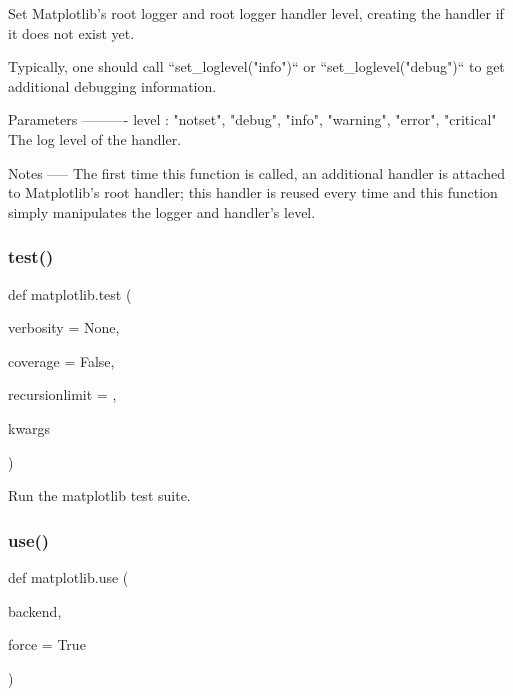 \begin{DoxyVerb}Set Matplotlib's root logger and root logger handler level, creating
the handler if it does not exist yet.

Typically, one should call ``set_loglevel("info")`` or
``set_loglevel("debug")`` to get additional debugging information.

Parameters
----------
level : {"notset", "debug", "info", "warning", "error", "critical"}
    The log level of the handler.

Notes
-----
The first time this function is called, an additional handler is attached
to Matplotlib's root handler; this handler is reused every time and this
function simply manipulates the logger and handler's level.
\end{DoxyVerb}
 \mbox{\label{namespacematplotlib_a26dc2f19a2e629436aac80fae8ecee84}} 
\subsubsection{\texorpdfstring{test()}{test()}}
{\footnotesize\ttfamily def matplotlib.\+test (\begin{DoxyParamCaption}\item[{}]{verbosity = {\ttfamily None},  }\item[{}]{coverage = {\ttfamily False},  }\item[{}]{recursionlimit = {},  }\item[{}]{kwargs }\end{DoxyParamCaption})}

\begin{DoxyVerb}Run the matplotlib test suite.\end{DoxyVerb}
 \mbox{\label{namespacematplotlib_a1b7516c119dd87a49d3063f1601c8349}} 
\subsubsection{\texorpdfstring{use()}{use()}}
{\footnotesize\ttfamily def matplotlib.\+use (\begin{DoxyParamCaption}\item[{}]{backend,  }\item[{}]{force = {\ttfamily True} }\end{DoxyParamCaption})}


